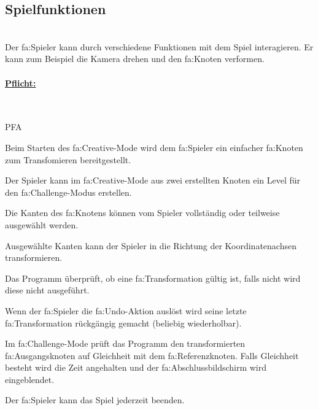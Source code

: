 %
%


\subsection{Spielfunktionen}

%
%
\renewcommand{\K}{}
%
%

~\\
Der \gls{fa:Spieler} kann durch verschiedene Funktionen mit dem Spiel interagieren. Er kann zum Beispiel die Kamera drehen und den \gls{fa:Knoten} verformen. 
\\

%
%
\paragraph*{\underline{Pflicht:}}~\\

\begin{ids}{\gls{PFA\K}}
	 	
 	\id[ 110] Beim Starten des \gls{fa:Creative}-Mode wird dem \gls{fa:Spieler} ein einfacher \gls{fa:Knoten} zum Transfomieren bereitgestellt.
 	
 	\id[ 120] Der Spieler kann im \gls{fa:Creative}-Mode aus zwei erstellten Knoten ein Level für den \gls{fa:Challenge}-Modus erstellen.
 	
 	\id[ 130] Die Kanten des \gls{fa:Knoten}s können vom Spieler vollständig oder teilweise ausgewählt werden.
 	
 	\id[ 140] Ausgewählte Kanten kann der Spieler in die Richtung der Koordinatenachsen transformieren.
 	
 	\id[ 150] Das Programm überprüft, ob eine \gls{fa:Transformation} gültig ist, falls nicht wird diese nicht ausgeführt.
 	
 	\id[ 160] Wenn der \gls{fa:Spieler} die \gls{fa:Undo}-Aktion auslöst wird seine letzte \gls{fa:Transformation} rückgängig gemacht (beliebig wiederholbar). 
 	
 	\id[ 170] Im \gls{fa:Challenge}-Mode prüft das Programm den transformierten \gls{fa:Ausgangsknoten} auf Gleichheit mit dem \gls{fa:Referenzknoten}. Falls Gleichheit besteht wird die Zeit angehalten und der \gls{fa:Abschlussbildschirm} wird eingeblendet.
 	
 	\id[ 180] Der \gls{fa:Spieler} kann das Spiel jederzeit beenden.
	
\end{ids}


